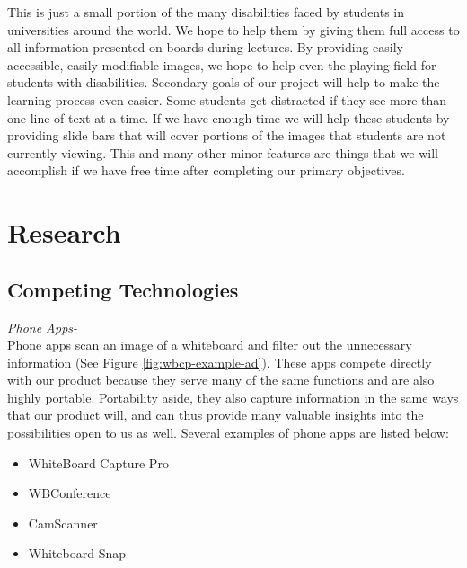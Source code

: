 \documentclass{article}
\begin{document}
This is just a small portion of the many disabilities faced by students in universities around the world. We hope to help them by giving them full access to all information presented on boards during lectures. By providing easily accessible, easily modifiable images, we hope to help even the playing field for students with disabilities.
Secondary goals of our project will help to make the learning process even easier. Some students get distracted if they see more than one line of text at a time. If we have enough time we will help these students by providing slide bars that will cover portions of the images that students are not currently viewing. This and many other minor features are things that we will accomplish if we have free time after completing our primary objectives. 

	\section{Research}
		\subsection*{Competing Technologies}
			
			\emph{Phone Apps-}\\
Phone apps scan an image of a whiteboard and filter out the unnecessary information (See Figure \ref{fig:wbcp-example-ad}). These apps compete directly with our product because they serve many of the same functions and are also highly portable. Portability aside, they also capture information in the same ways that our product will, and can thus provide many valuable insights into the possibilities open to us as well. Several examples of phone apps are listed below:

			\begin{itemize}
				\item WhiteBoard Capture Pro
				\item WBConference
				\item CamScanner
				\item Whiteboard Snap
			\end{itemize} 
			
\end{document}
